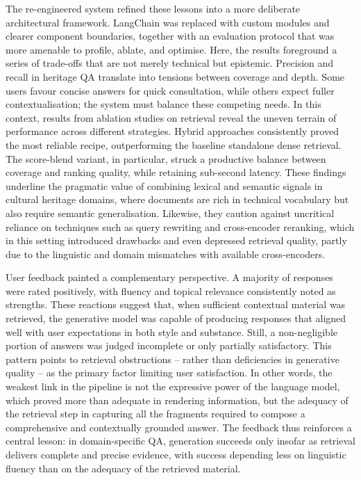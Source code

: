 \begin{spacing}{1.5}
The re-engineered system refined these lessons into a more deliberate architectural framework. LangChain was replaced with custom modules and clearer component boundaries, together with an evaluation protocol that was more amenable to profile, ablate, and optimise. Here, the results foreground a series of trade-offs that are not merely technical but epistemic. Precision and recall in heritage QA translate into tensions between coverage and depth. Some users favour concise answers for quick consultation, while others expect fuller contextualisation; the system must balance these competing needs. In this context, results from ablation studies on retrieval reveal the uneven terrain of performance across different strategies. Hybrid approaches consistently proved the most reliable recipe, outperforming the baseline standalone dense retrieval. The score-blend variant, in particular, struck a productive balance between coverage and ranking quality, while retaining sub-second latency. These findings underline the pragmatic value of combining lexical and semantic signals in cultural heritage domains, where documents are rich in technical vocabulary but also require semantic generalisation. Likewise, they caution against uncritical reliance on techniques such as query rewriting and cross-encoder reranking, which in this setting introduced drawbacks and even depressed retrieval quality, partly due to the linguistic and domain mismatches with available cross-encoders.

User feedback painted a complementary perspective. A majority of responses were rated positively, with fluency and topical relevance consistently noted as strengths. These reactions suggest that, when sufficient contextual material was retrieved, the generative model was capable of producing responses that aligned well with user expectations in both style and substance. Still, a non-negligible portion of answers was judged incomplete or only partially satisfactory. This pattern points to retrieval obstructions -- rather than deficiencies in generative quality -- as the primary factor limiting user satisfaction. In other words, the weakest link in the pipeline is not the expressive power of the language model, which proved more than adequate in rendering information, but the adequacy of the retrieval step in capturing all the fragments required to compose a comprehensive and contextually grounded answer. The feedback thus reinforces a central lesson: in domain-specific QA, generation succeeds only insofar as retrieval delivers complete and precise evidence, with success depending less on linguistic fluency than on the adequacy of the retrieved material.


\end{spacing}
